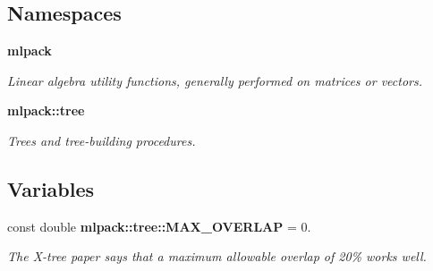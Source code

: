 \subsection*{Namespaces}
\begin{DoxyCompactItemize}
\item 
 {\bf mlpack}
\begin{DoxyCompactList}\small\item\em Linear algebra utility functions, generally performed on matrices or vectors. \end{DoxyCompactList}\item 
 {\bf mlpack\+::tree}
\begin{DoxyCompactList}\small\item\em Trees and tree-\/building procedures. \end{DoxyCompactList}\end{DoxyCompactItemize}
\subsection*{Variables}
\begin{DoxyCompactItemize}
\item 
const double {\bf mlpack\+::tree\+::\+M\+A\+X\+\_\+\+O\+V\+E\+R\+L\+AP} = 0.
\begin{DoxyCompactList}\small\item\em The X-\/tree paper says that a maximum allowable overlap of 20\% works well. \end{DoxyCompactList}\end{DoxyCompactItemize}
